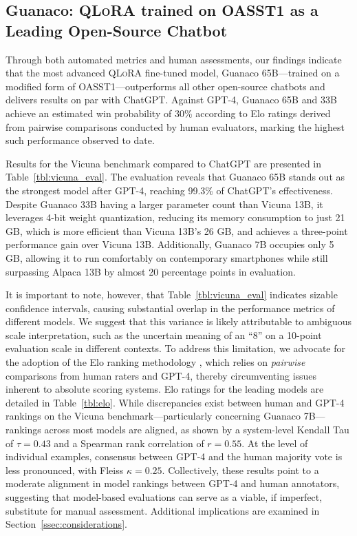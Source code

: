\subsection{\textbf{Guanaco}: \textsc{QLoRA} trained on OASST1 as a Leading Open-Source Chatbot}

Through both automated metrics and human assessments, our findings indicate that the most advanced \textsc{QLoRA} fine-tuned model, {Guanaco} 65B—trained on a modified form of OASST1—outperforms all other open-source chatbots and delivers results on par with ChatGPT. Against GPT-4, {Guanaco} 65B and 33B achieve an estimated win probability of 30\% according to Elo ratings derived from pairwise comparisons conducted by human evaluators, marking the highest such performance observed to date.

Results for the Vicuna benchmark \cite{vicuna2023} compared to ChatGPT are presented in Table~\ref{tbl:vicuna_eval}. The evaluation reveals that {Guanaco} 65B stands out as the strongest model after GPT-4, reaching 99.3\% of ChatGPT’s effectiveness. Despite {Guanaco} 33B having a larger parameter count than Vicuna 13B, it leverages 4-bit weight quantization, reducing its memory consumption to just 21 GB, which is more efficient than Vicuna 13B’s 26 GB, and achieves a three-point performance gain over Vicuna 13B. Additionally, {Guanaco} 7B occupies only 5 GB, allowing it to run comfortably on contemporary smartphones while still surpassing Alpaca 13B by almost 20 percentage points in evaluation.

It is important to note, however, that Table~\ref{tbl:vicuna_eval} indicates sizable confidence intervals, causing substantial overlap in the performance metrics of different models. We suggest that this variance is likely attributable to ambiguous scale interpretation, such as the uncertain meaning of an “8” on a 10-point evaluation scale in different contexts. To address this limitation, we advocate for the adoption of the Elo ranking methodology \citep{elo1967proposed}, which relies on \textit{pairwise} comparisons from human raters and GPT-4, thereby circumventing issues inherent to absolute scoring systems. Elo ratings for the leading models are detailed in Table~\ref{tbl:elo}. While discrepancies exist between human and GPT-4 rankings on the Vicuna benchmark—particularly concerning Guanaco 7B—rankings across most models are aligned, as shown by a system-level Kendall Tau of $\tau=0.43$ and a Spearman rank correlation of $r=0.55$. At the level of individual examples, consensus between GPT-4 and the human majority vote is less pronounced, with Fleiss $\kappa=0.25$. Collectively, these results point to a moderate alignment in model rankings between GPT-4 and human annotators, suggesting that model-based evaluations can serve as a viable, if imperfect, substitute for manual assessment. Additional implications are examined in Section~\ref{ssec:considerations}.

